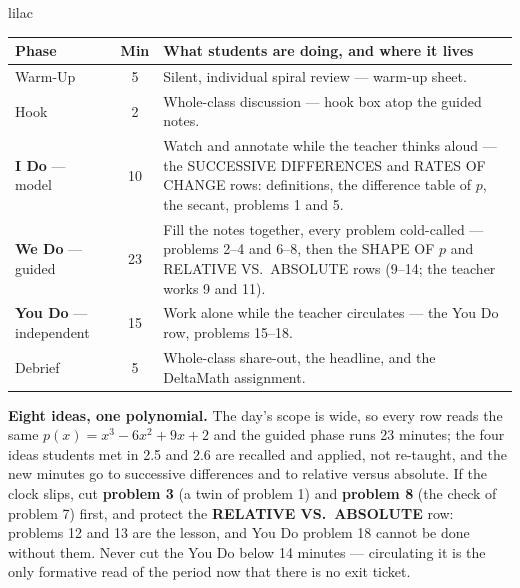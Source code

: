 \documentclass[10pt]{article}
\begin{document}
\boxguard[22]
\begin{skillbox}{lilac}
\small
\renewcommand{\arraystretch}{1.25}
\begin{tabularx}{\linewidth}{@{} l c X @{}}
\textbf{Phase} & \textbf{Min} & \textbf{What students are doing, and where it lives} \\
\midrule
Warm-Up                       & 5  & Silent, individual spiral review --- warm-up sheet. \\
Hook                          & 2  & Whole-class discussion --- hook box atop the guided notes. \\
\textbf{I Do} --- model       & 10 & Watch and annotate while the teacher thinks aloud --- the SUCCESSIVE DIFFERENCES and RATES OF CHANGE rows: definitions, the difference table of $p$, the secant, problems 1 and 5. \\
\textbf{We Do} --- guided     & 23 & Fill the notes together, every problem cold-called --- problems 2--4 and 6--8, then the SHAPE OF $p$ and RELATIVE VS.\ ABSOLUTE rows (9--14; the teacher works 9 and 11). \\
\textbf{You Do} --- independent & 15 & Work alone while the teacher circulates --- the You Do row, problems 15--18. \\
Debrief                       & 5  & Whole-class share-out, the headline, and the DeltaMath assignment. \\
\end{tabularx}

\smallskip
\textbf{Eight ideas, one polynomial.} The day's scope is wide, so every row reads the same
$p(x) = x^3 - 6x^2 + 9x + 2$ and the guided phase runs 23 minutes; the four ideas students met in
2.5 and 2.6 are recalled and applied, not re-taught, and the new minutes go to successive
differences and to relative versus absolute. If the clock slips, cut \textbf{problem 3} (a twin
of problem 1) and \textbf{problem 8} (the check of problem 7) first, and protect the
\textbf{RELATIVE VS.\ ABSOLUTE} row: problems 12 and 13 are the lesson, and You Do problem 18
cannot be done without them. Never cut the You Do below 14 minutes --- circulating it is the
only formative read of the period now that there is no exit ticket.
\end{skillbox}
\end{document}
